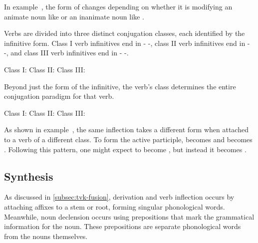 In example~, the form of   changes depending on whether it is modifying an animate noun like   or an inanimate noun like  .

Verbs are divided into three distinct conjugation classes, each identified by the infinitive form. Class I verb infinitives end in - -, class II verb infinitives end in - -, and class III verb infinitives end in - -.

	Class I:     
	\a<cl2>Class II:     
	\a<cl3>Class III:     
\xe

Beyond just the form of the infinitive, the verb's class determines the entire conjugation paradigm for that verb.

	Class I:     
	\a<cl2>Class II:     
	\a<cl3>Class III:     
\xe

As shown in example~, the same inflection takes a different form when attached to a verb of a different class. To form the active participle,   becomes   and   becomes  . Following this pattern, one might expect   to become \ungr{} \ungr{}, but instead it becomes  .


\subsection{Synthesis}
\label{subsec:tvk-synthesis}

As discussed in \autoref{subsec:tvk-fusion}, derivation and verb inflection occurs by attaching affixes to a stem or root, forming singular phonological words. Meanwhile, noun declension occurs using prepositions that mark the grammatical information for the noun. These prepositions are separate phonological words from the nouns themselves.


